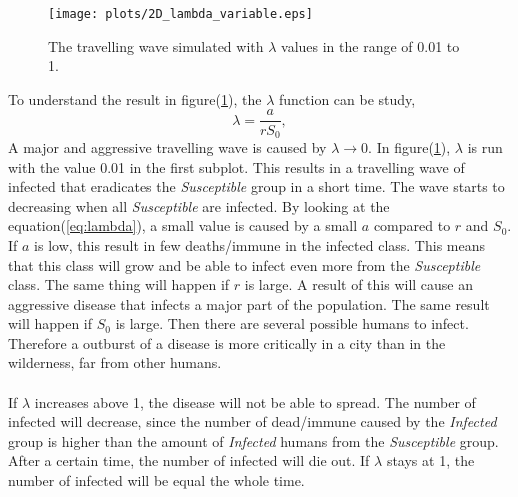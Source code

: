 \documentclass[%
twoside,                 %
final,                   %
10pt]{article}
\begin{document}
\begin{figure}[ht]
  \centerline{\texttt{[image: plots/2D\_lambda\_variable.eps]}}
  \caption{
  \label{fig:change_lambda} The travelling wave simulated with $\lambda$ values in the range of 0.01 to 1.
  }
\end{figure}


To understand the result in figure(\ref{fig:change_lambda}), the $\lambda $ function can be study,
\begin{equation} \label{eq:lambda}
 \lambda =\frac{a}{rS_0},
\end{equation}
A major and aggressive travelling wave is caused by $\lambda \rightarrow 0$. In figure(\ref{fig:change_lambda}), $\lambda$ is run with the value 0.01 in the first subplot. This results in a travelling wave of infected that eradicates the \emph{Susceptible} group in a short time. The wave starts to decreasing when all \emph{Susceptible} are infected. By looking at the equation(\ref{eq:lambda}), a small value is caused by a small $a$ compared to $r$ and $S_0$. If $a$ is low, this result in few deaths/immune in the infected class. This means that this class will grow and be able to infect even more from the \emph{Susceptible} class. The same thing will happen if $r$ is large. A result of this will cause an aggressive disease that infects  a major part of the population. The same result will happen if $S_0$ is large. Then there are several possible humans to infect. Therefore a outburst of a disease is more critically in a city than in the wilderness, far from other humans.
\\
\\
If $\lambda$ increases above 1, the disease will not be able to spread. The number of infected will decrease, since the number of dead/immune caused by the \emph{Infected} group is higher than the amount of \emph{Infected} humans from the \emph{Susceptible} group. After a certain time, the number of infected will die out. If $\lambda$ stays at 1, the number of infected will be equal the whole time. 
\end{document}
